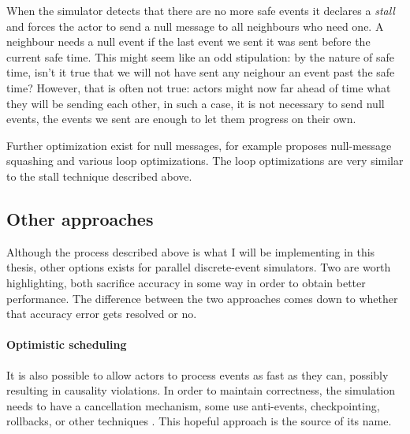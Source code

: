 When the simulator detects that there are no more safe events it declares a \emph{stall} and forces the actor to send a null message to all neighbours who need one.
A neighbour needs a null event if the last event we sent it was sent before the current safe time.
This might seem like an odd stipulation: by the nature of safe time, isn't it true that we will not have sent any neighour an event past the safe time?
However, that is often not true: actors might now  far ahead of time what they will be sending each other, in such a case, it is not necessary to send null events, the events we sent are enough to let them progress on their own.

Further optimization exist for null messages, for example \cite{wang_enhanced_2016} proposes null-message squashing and various loop optimizations.
The loop optimizations are very similar to the stall technique described above.


\subsection{Other approaches}

Although the process described above  is what I will be implementing in this thesis, other options exists for parallel discrete-event simulators.
Two are worth highlighting, both sacrifice accuracy in some way in order to obtain better performance.
The difference between the two approaches comes down to whether that accuracy error gets resolved or no.

\paragraph{Optimistic scheduling} \label{optimistic-scheduling}
It is also possible to allow actors to process events as fast as they can, possibly resulting in causality violations.
In order to maintain correctness, the simulation needs to have a cancellation mechanism, some use anti-events, checkpointing, rollbacks, or other techniques \cite{fujimoto_parallel_2015}.
This hopeful approach is the source of its name. 

